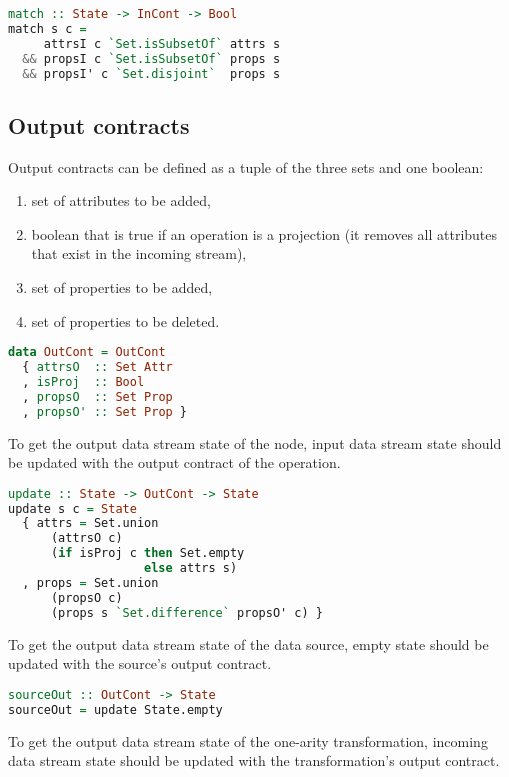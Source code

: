 \begin{lstlisting}[language=Haskell]
match :: State -> InCont -> Bool
match s c =
     attrsI c `Set.isSubsetOf` attrs s
  && propsI c `Set.isSubsetOf` props s
  && propsI' c `Set.disjoint`  props s
\end{lstlisting}

\subsection{Output contracts}

Output contracts can be defined as a tuple of the three sets and one boolean:
\begin{enumerate}
    \item set of attributes to be added,
    \item boolean that is true if an operation is a projection (it removes all attributes that exist in the incoming stream),
    \item set of properties to be added,
    \item set of properties to be deleted.
\end{enumerate}

\begin{lstlisting}[language=Haskell]
data OutCont = OutCont
  { attrsO  :: Set Attr
  , isProj  :: Bool
  , propsO  :: Set Prop
  , propsO' :: Set Prop }
\end{lstlisting}

To get the output data stream state of the node, input data stream state should be updated with the output contract of the operation.

\begin{lstlisting}[language=Haskell]
update :: State -> OutCont -> State
update s c = State
  { attrs = Set.union
      (attrsO c)
      (if isProj c then Set.empty
                   else attrs s)
  , props = Set.union
      (propsO c)
      (props s `Set.difference` propsO' c) }
\end{lstlisting}

To get the output data stream state of the data source, empty state should be updated with the source's output contract.

\begin{lstlisting}[language=Haskell]
sourceOut :: OutCont -> State
sourceOut = update State.empty
\end{lstlisting}

To get the output data stream state of the one-arity transformation, incoming data stream state should be updated with the transformation's output contract.

